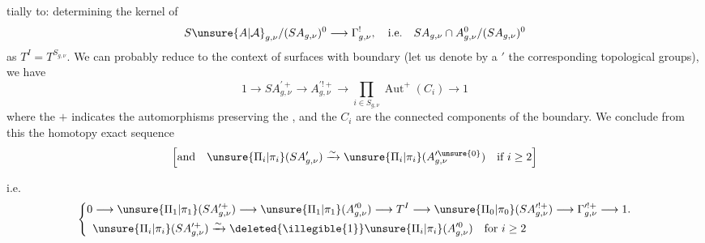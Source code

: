 tially to: determining the kernel of
\[
S\unsure{A|\mathcal A}_{g,\nu}/(SA_{g,\nu})^0\longrightarrow\Gamma^!_{g,\nu},
\quad\text{i.e.}\quad
SA_{g,\nu}\cap A_{g,\nu}^0/(SA_{g,\nu})^0
\]
as $T^I=T^{S_{g,\nu}}$. We can probably reduce to the context of  surfaces with boundary (let us denote by a $'$ the corresponding topological groups), we have
\[
1\longrightarrow SA_{g,\nu}^{\prime+}\longrightarrow
A_{g,\nu}^{\prime!+}\longrightarrow
\prod_{i\in S_{g,\nu}}\operatorname{Aut}^+(C_i)\longrightarrow1
\]
where the $+$ indicates the automorphisms preserving the , and the $C_i$ are the connected components of the boundary. We conclude from this the homotopy exact sequence
\[
\left[\text{and}\quad
\unsure{\Pi_i|\pi_i}(SA'_{g,\nu})\xrightarrow{\sim}
\unsure{\Pi_i|\pi_i}(A_{g,\nu}^{\prime\unsure{0}})
\quad\text{if }i\geq2\right]
\]

i.e.
\[
\left\{\begin{aligned}
0&\longrightarrow\unsure{\Pi_1|\pi_1}(SA_{g,\nu}^{\prime+})
\longrightarrow\unsure{\Pi_1|\pi_1}(A_{g,\nu}^{\prime0})
\longrightarrow T^I\longrightarrow\unsure{\Pi_0|\pi_0}(SA_{g,\nu}^{\prime!+})
\longrightarrow\Gamma_{g,\nu}^{\prime!+}\longrightarrow1.\\
&\unsure{\Pi_i|\pi_i}(SA_{g,\nu}^{\prime+})\xrightarrow{\sim}
\deleted{\illegible{1}}\unsure{\Pi_i|\pi_i}(A_{g,\nu}^{\prime0})
\quad\text{for }i\geq2
\end{aligned}\right.
\]

